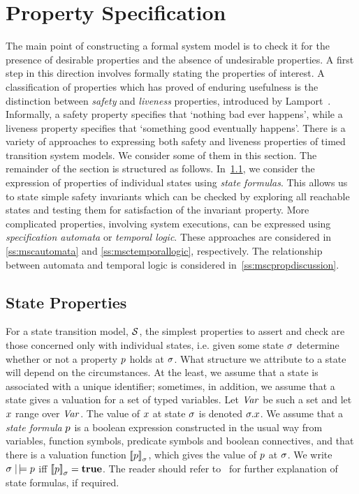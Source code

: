 {\section{Property Specification}\label{sec:mscspec}
The main point of constructing a formal system model is to check it
for the presence of desirable properties and the absence of
undesirable properties. A first step in this direction involves
formally stating the properties of interest. A classification of 
properties which has proved of enduring usefulness is the distinction
between \emph{safety} and \emph{liveness} properties,
introduced by Lamport~\cite{lam:77,lam:80}. Informally, a safety
property specifies that `nothing bad ever happens', while a
liveness property specifies that `something good eventually happens'.
There is a variety of approaches to expressing both safety and
liveness properties of timed transition system models. We consider
some of them in this section. The remainder of the section is
structured as follows.  In~\Sec\ref{ss:mscstateproperties}, we
consider the expression of properties of individual states using
\emph{state formulas}. This allows us to state simple safety
invariants which can be checked by exploring all reachable states and
testing them for satisfaction of the invariant property. More
complicated properties, involving system executions, can be expressed
using \emph{specification automata} or \emph{temporal logic}. These
approaches are considered in \Sec\ref{ss:mscautomata} and
\Sec\ref{ss:msctemporallogic}, respectively. The relationship 
between automata and temporal logic is considered 
in~\Sec\ref{ss:mscpropdiscussion}.

\subsection{State Properties}\label{ss:mscstateproperties}
For a state transition model, $\SS$, the simplest properties to assert
and check are those concerned only with individual states, i.e. given
some state $\sigma$ determine whether or not a property $p$ holds
at $\sigma$. What structure we attribute to a state will depend on the
circumstances. At the least, we assume that a state is
associated with a unique identifier;
sometimes, in addition, we assume that a state gives a valuation for a
set of typed variables. Let ${\text{\it Var\/}}$ be such a set and let $x$ range
over ${\text{\it Var\/}}$.  The value of $x$ at state $\sigma$ is denoted
$\sigma.x$. We assume that a \emph{state formula} $p$ is a boolean
expression constructed in the usual way from variables, function
symbols, predicate symbols and boolean connectives, and that there is
a valuation function ${\lbrack\!\lbrack}p{\rbrack\!\rbrack}_\sigma$, which gives the value of
$p$ at $\sigma$. We write $\sigma \mathrel{|\!\models}
p$ iff ${\lbrack\!\lbrack}p{\rbrack\!\rbrack}_\sigma = {\mbox{\rm\bf true}}$. The reader should refer 
to~\cite{mp:92} for further explanation of state formulas, if required.

}

